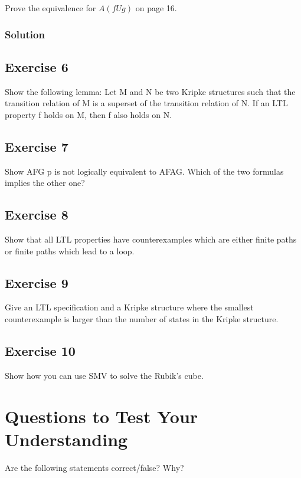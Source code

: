 \documentclass[a4paper, 11pt]{article}
\begin{document}
Prove the equivalence for $A(f U g)$ on page 16.

\subsubsection{Solution}



\subsection{Exercise 6}

Show the following lemma: Let M and N be two Kripke structures such that the transition relation of M is a superset of the transition relation of N. If an LTL property f holds on M, then f also holds on N.

\subsection{Exercise 7}

Show AFG p is not logically equivalent to AFAG. Which of the two formulas implies the other one?

\subsection{Exercise 8}

Show that all LTL properties have counterexamples which are either finite paths or finite paths which lead to a loop.

\subsection{Exercise 9}

Give an LTL specification and a Kripke structure where the smallest counterexample is larger than the number of states in the Kripke structure.

\subsection{Exercise 10}

Show how you can use SMV to solve the Rubik’s cube.

\section{Questions to Test Your Understanding}

Are the following statements correct/false? Why?
\end{document}
